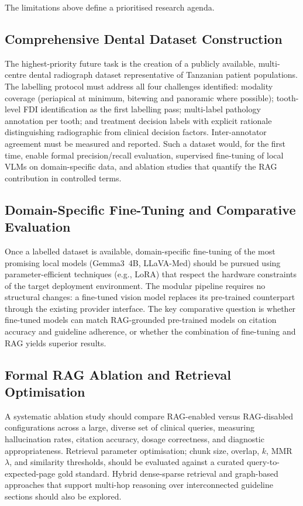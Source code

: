\documentclass[12pt,a4paper]{report}
\begin{document}
The limitations above define a prioritised research agenda.

\subsection{Comprehensive Dental Dataset Construction}

The highest-priority future task is the creation of a publicly available,
multi-centre dental radiograph dataset representative of Tanzanian patient
populations. The labelling protocol must address all four challenges identified:
modality coverage (periapical at minimum, bitewing and panoramic where possible);
tooth-level FDI identification as the first labelling pass; multi-label
pathology annotation per tooth; and treatment decision labels with explicit
rationale distinguishing radiographic from clinical decision factors.
Inter-annotator agreement must be measured and reported. Such a dataset would,
for the first time, enable formal precision/recall evaluation, supervised
fine-tuning of local VLMs on domain-specific data, and ablation studies that
quantify the RAG contribution in controlled terms.

\subsection{Domain-Specific Fine-Tuning and Comparative Evaluation}

Once a labelled dataset is available, domain-specific fine-tuning of the most
promising local models (Gemma3~4B, LLaVA-Med) should be pursued using
parameter-efficient techniques (e.g., LoRA) that respect the hardware constraints
of the target deployment environment. The modular pipeline requires no structural
changes: a fine-tuned vision model replaces its pre-trained counterpart through
the existing provider interface. The key comparative question is whether
fine-tuned models can match RAG-grounded pre-trained models on citation accuracy
and guideline adherence, or whether the combination of fine-tuning and RAG
yields superior results.

\subsection{Formal RAG Ablation and Retrieval Optimisation}

A systematic ablation study should compare RAG-enabled versus RAG-disabled
configurations across a large, diverse set of clinical queries, measuring
hallucination rates, citation accuracy, dosage correctness, and diagnostic
appropriateness. Retrieval parameter optimisation; chunk size, overlap,
$k$, MMR $\lambda$, and similarity thresholds, should be evaluated against
a curated query-to-expected-page gold standard. Hybrid dense-sparse retrieval
and graph-based approaches that support multi-hop reasoning over interconnected
guideline sections should also be explored.
\end{document}
